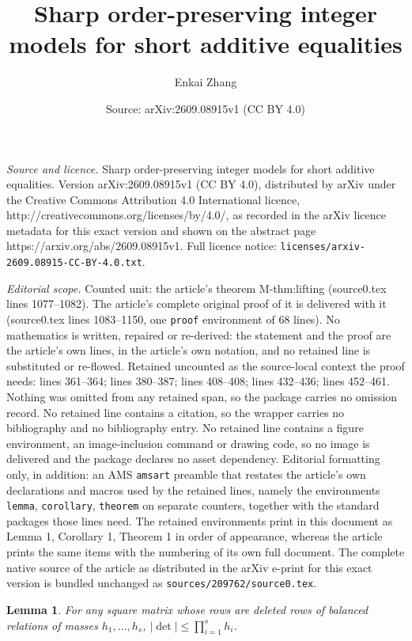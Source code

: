 \documentclass[10pt,a4paper]{amsart}
\title{Sharp order-preserving integer models for short additive equalities}
\author{Enkai Zhang}
\date{Source: arXiv:2609.08915v1 (CC BY 4.0)}
\newtheorem{lemma}{Lemma}
\begin{document}
\maketitle

\noindent\emph{Source and licence.} Sharp order-preserving integer models for short additive equalities. Version arXiv:2609.08915v1 (CC BY 4.0), distributed by arXiv under the Creative Commons Attribution 4.0 International licence, http://creativecommons.org/licenses/by/4.0/, as recorded in the arXiv licence metadata for this exact version and shown on the abstract page https://arxiv.org/abs/2609.08915v1. Full licence notice: \texttt{licenses/arxiv-2609.08915-CC-BY-4.0.txt}.\par\smallskip

\noindent\textit{Editorial scope.} Counted unit: the article's theorem M-thm:lifting (source0.tex lines 1077--1082). The article's complete original proof of it is delivered with it (source0.tex lines 1083--1150, one \texttt{proof} environment of 68 lines). No mathematics is written, repaired or re-derived: the statement and the proof are the article's own lines, in the article's own notation, and no retained line is substituted or re-flowed.  Retained uncounted as the source-local context the proof needs: lines 361--364; lines 380--387; lines 408--408; lines 432--436; lines 452--461.  Nothing was omitted from any retained span, so the package carries no omission record.  No retained line contains a citation, so the wrapper carries no bibliography and no bibliography entry.  No retained line contains a figure environment, an image-inclusion command or drawing code, so no image is delivered and the package declares no asset dependency.  Editorial formatting only, in addition: an AMS \texttt{amsart} preamble that restates the article's own declarations and macros used by the retained lines, namely the environments \texttt{lemma}, \texttt{corollary}, \texttt{theorem} on separate counters, together with the standard packages those lines need.  The retained environments print in this document as Lemma 1, Corollary 1, Theorem 1 in order of appearance, whereas the article prints the same items with the numbering of its own full document.  The complete native source of the article as distributed in the arXiv e-print for this exact version is bundled unchanged as \texttt{sources/209762/source0.tex}.
\begin{lemma}\label{M-lem:mass-minor}
For any square matrix whose rows are deleted rows of balanced relations of
masses $h_1,\ldots,h_s$, $|\det|\le\prod_{i=1}^sh_i$.
\end{lemma}
\end{document}

